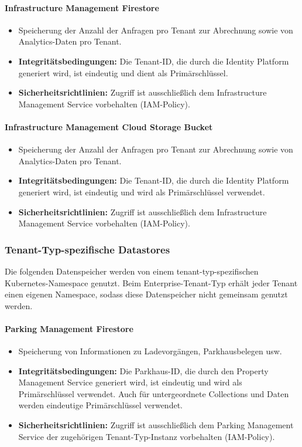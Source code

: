 \paragraph{Infrastructure Management Firestore}
\begin{itemize}
	\item Speicherung der Anzahl der Anfragen pro Tenant zur Abrechnung sowie von Analytics-Daten pro Tenant.
	\item \textbf{Integritätsbedingungen:} Die Tenant-ID, die durch die Identity Platform generiert wird, ist eindeutig und dient als Primärschlüssel.
	\item \textbf{Sicherheitsrichtlinien:} Zugriff ist ausschließlich dem Infrastructure Management Service vorbehalten (IAM-Policy).
\end{itemize}

\paragraph{Infrastructure Management Cloud Storage Bucket}
\begin{itemize}
	\item Speicherung der Anzahl der Anfragen pro Tenant zur Abrechnung sowie von Analytics-Daten pro Tenant.
	\item \textbf{Integritätsbedingungen:} Die Tenant-ID, die durch die Identity Platform generiert wird, ist eindeutig und wird als Primärschlüssel verwendet.
	\item \textbf{Sicherheitsrichtlinien:} Zugriff ist ausschließlich dem Infrastructure Management Service vorbehalten (IAM-Policy).
\end{itemize}

\subsubsection{Tenant-Typ-spezifische Datastores}
Die folgenden Datenspeicher werden von einem tenant-typ-spezifischen Kubernetes-Namespace genutzt. Beim Enterprise-Tenant-Typ erhält jeder Tenant einen eigenen Namespace, sodass diese Datenspeicher nicht gemeinsam genutzt werden.

\paragraph{Parking Management Firestore}
\begin{itemize}
	\item Speicherung von Informationen zu Ladevorgängen, Parkhausbelegen usw.
	\item \textbf{Integritätsbedingungen:} Die Parkhaus-ID, die durch den Property Management Service generiert wird, ist eindeutig und wird als Primärschlüssel verwendet. Auch für untergeordnete Collections und Daten werden eindeutige Primärschlüssel verwendet.
	\item \textbf{Sicherheitsrichtlinien:} Zugriff ist ausschließlich dem Parking Management Service der zugehörigen Tenant-Typ-Instanz vorbehalten (IAM-Policy).
\end{itemize}

